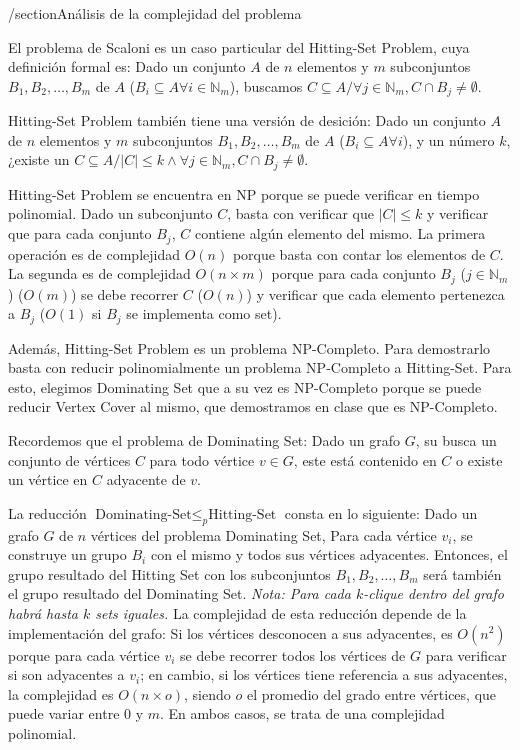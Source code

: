 /section{Análisis de la complejidad del problema}

El problema de Scaloni es un caso particular del Hitting-Set Problem, cuya definición formal es:
Dado un conjunto $A$ de $n$ elementos y $m$ subconjuntos $B_{1},B_{2},\dots,B_{m}$ de $A$ 
($B_{i}\subseteq A \forall i \in \mathbb{N}_{m}$), buscamos $C \subseteq A / \forall j \in \mathbb{N}_{m},  C \cap B_{j}\neq \emptyset$.

Hitting-Set Problem también tiene una versión de desición:
Dado un conjunto $A$ de $n$ elementos y $m$ subconjuntos $B_{1},B_{2},\dots,B_{m}$ de $A$ ($B_{i}\subseteq A \forall i$), y un número $k$, ¿existe un $C \subseteq A / \left| C \right|\leq k \land \forall j \in \mathbb{N}_{m},  C \cap B_{j}\neq \emptyset$.

Hitting-Set Problem se encuentra en NP porque se puede verificar en tiempo polinomial.
Dado un subconjunto $C$, basta con verificar que $\left| C \right|\leq k$ y verificar que para cada
conjunto $B_{j}$, $C$ contiene algún elemento del mismo. La primera operación es de complejidad $O(n)$
porque basta con contar los elementos de $C$.
La segunda es de complejidad $O(n\times m)$ porque para cada conjunto $B_{j}$ ($j \in \mathbb{N}_{m}$) ($O(m)$) se debe recorrer $C$ ($O(n)$) y verificar que cada elemento pertenezca a $B_{j}$ ($O(1)$ si $B_{j}$ se implementa como set).

Además, Hitting-Set Problem es un problema NP-Completo.
Para demostrarlo basta con reducir polinomialmente un problema NP-Completo a Hitting-Set. Para esto, elegimos Dominating Set que a su vez es NP-Completo porque se puede reducir Vertex Cover al mismo, que demostramos en clase que es NP-Completo.

Recordemos que el problema de Dominating Set: Dado un grafo $G$, su busca un conjunto de vértices $C$ para todo vértice $v \in G$, este está contenido en $C$ o existe un vértice en $C$ adyacente de $v$.

La reducción $\text{Dominating-Set} \leq _{p} \text{Hitting-Set}$ consta en lo siguiente:
Dado un grafo $G$ de $n$ vértices del problema Dominating Set, Para cada vértice $v_{i}$, se construye un grupo $B_{i}$ con el mismo y todos sus vértices adyacentes. Entonces, el grupo resultado del Hitting Set con los subconjuntos $B_{1},B_{2},\dots,B_{m}$ será también el grupo resultado del Dominating Set. \textit{Nota: Para cada $k$-clique dentro del grafo habrá hasta $k$ sets iguales.} La complejidad de esta reducción depende de la implementación del grafo: Si los vértices desconocen a sus adyacentes, es $O(n^{2})$ porque para cada vértice $v_{i}$ se debe recorrer todos los vértices de $G$ para verificar si son adyacentes a $v_{i}$; en cambio, si los vértices tiene referencia a sus adyacentes, la complejidad es $O(n\times o)$, siendo $o$ el promedio del grado entre vértices, que puede variar entre $0$ y $m$. En ambos casos, se trata de una complejidad polinomial.

